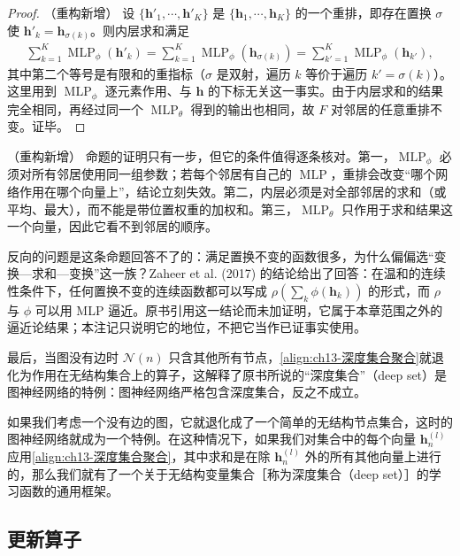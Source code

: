 \documentclass[../../main.tex]{subfiles}
\begin{document}
\begin{proof}（重构新增）
设 $\{\bm{h}'_1,\cdots,\bm{h}'_K\}$ 是 $\{\bm{h}_1,\cdots,\bm{h}_K\}$ 的一个重排，即存在置换 $\sigma$ 使 $\bm{h}'_k=\bm{h}_{\sigma(k)}$。则内层求和满足
\begin{align*}
\sum_{k=1}^{K}\operatorname{MLP}_\phi(\bm{h}'_k)=\sum_{k=1}^{K}\operatorname{MLP}_\phi(\bm{h}_{\sigma(k)})=\sum_{k'=1}^{K}\operatorname{MLP}_\phi(\bm{h}_{k'}),
\end{align*}
其中第二个等号是有限和的重指标（$\sigma$ 是双射，遍历 $k$ 等价于遍历 $k'=\sigma(k)$）。这里用到 $\operatorname{MLP}_\phi$ 逐元素作用、与 $\bm{h}$ 的下标无关这一事实。由于内层求和的结果完全相同，再经过同一个 $\operatorname{MLP}_\theta$ 得到的输出也相同，故 $F$ 对邻居的任意重排不变。证毕。
\end{proof}

\begin{remark}（重构新增）
命题的证明只有一步，但它的条件值得逐条核对。第一，$\operatorname{MLP}_\phi$ 必须对所有邻居使用同一组参数；若每个邻居有自己的 $\operatorname{MLP}$，重排会改变“哪个网络作用在哪个向量上”，结论立刻失效。第二，内层必须是对全部邻居的求和（或平均、最大），而不能是带位置权重的加权和。第三，$\operatorname{MLP}_\theta$ 只作用于求和结果这一个向量，因此它看不到邻居的顺序。\par
反向的问题是这条命题回答不了的：满足置换不变的函数很多，为什么偏偏选“变换—求和—变换”这一族？Zaheer et al. (2017) 的结论给出了回答：在温和的连续性条件下，任何置换不变的连续函数都可以写成 $\rho\left(\sum_k\phi(\bm{h}_k)\right)$ 的形式，而 $\rho$ 与 $\phi$ 可以用 MLP 逼近。原书引用这一结论而未加证明，它属于本章范围之外的逼近论结果；本注记只说明它的地位，不把它当作已证事实使用。\par
最后，当图没有边时 $\mathcal{N}(n)$ 只含其他所有节点，\eqref{align:ch13-深度集合聚合}就退化为作用在无结构集合上的算子，这解释了原书所说的“深度集合”（deep set）是图神经网络的特例：图神经网络严格包含深度集合，反之不成立。
\end{remark}

如果我们考虑一个没有边的图，它就退化成了一个简单的无结构节点集合，这时的图神经网络就成为一个特例。在这种情况下，如果我们对集合中的每个向量 $\bm{h}_n^{(l)}$ 应用\eqref{align:ch13-深度集合聚合}，其中求和是在除 $\bm{h}_n^{(l)}$ 外的所有其他向量上进行的，那么我们就有了一个关于无结构变量集合［称为深度集合（deep set）］的学习函数的通用框架。

\subsection{更新算子}\label{subsection:ch13-更新算子}
\end{document}
